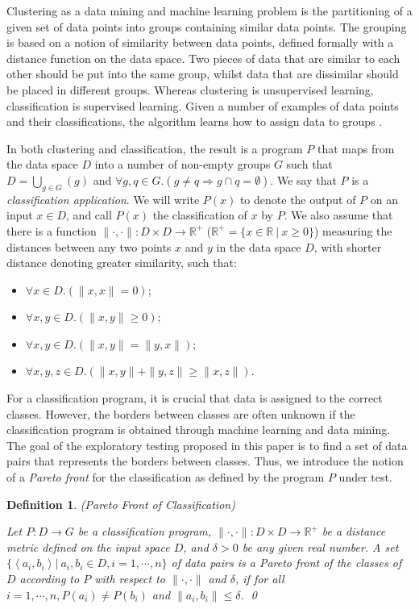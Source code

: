 \documentclass[preprint,1p,authoryear,times]{elsarticle}
\newtheorem{Definition}{Definition}
\begin{document}
Clustering as a data mining and machine learning problem is the partitioning of a given set of data points into groups containing similar data points. The grouping is based on a notion of similarity between data points, defined formally with a distance function on the data space. Two pieces of data that are similar to each other should be put into the same group, whilst data that are dissimilar should be placed in different groups. Whereas clustering is unsupervised learning, classification is supervised learning. Given a number of examples of data points and their classifications, the algorithm learns how to assign data to groups \citep{DataMiningTextBook, FoundationsOfMLBook, UnderstandingMLBook}. 

In both clustering and classification, the result is a program  $P$ that maps from the data space $D$ into a number of non-empty groups $G$ such that $D=\bigcup_{g \in G}(g)$ and $\forall g,q \in G.(g \neq q \Rightarrow g \cap q = \emptyset)$. We say that $P$ is a \emph{classification application}. We will write $P(x)$ to denote the output of $P$ on an input $x \in D$, and call $P(x)$ the classification of $x$ by $P$. We also assume that there is a function $\|\cdot,\cdot\|: D \times D \rightarrow \mathbb{R}^+$ ($\mathbb{R}^+ = \{ x \in \mathbb{R} ~|~ x \geq 0 \}$) measuring the distances between any two points $x$ and $y$ in the data space $D$, with shorter distance denoting greater similarity, such that:

\begin{itemize}
\item $\forall x \in D. (\|x,x\|=0)$; 
\item $\forall x,y \in D. (\|x,y\|\geq 0)$;
\item $\forall x, y \in D. (\|x,y\| = \|y,x\|)$; 
\item $\forall x,y,z \in D. (\|x,y\|+ \|y,z\| \geq \|x,z\|)$.
\end{itemize}

For a classification program, it is crucial that data is assigned to the correct classes. However, the borders between classes are often unknown if the classification program is obtained through machine learning and data mining. The goal of the exploratory testing proposed in this paper is to find a set of data pairs that represents the borders between classes. Thus, we introduce the notion of a \emph{Pareto front} for the classification as defined by the program $P$ under test. 

\begin{Definition} \label{def:Pareto} (Pareto Front of Classification) 

Let $P: D \rightarrow G$ be a classification program, $\|\cdot,\cdot\|: D \times  D \rightarrow  \mathbb{R}^+$ be a distance metric defined on the input space $D$, and  $\delta > 0$ be any given real number. A set $\{\left<a_i,b_i\right> |~ a_i, b_i \in D, i=1,\cdots,n \}$  of data pairs is a \emph{Pareto front} of the classes of $D$ according to $P$ with respect to $\|\cdot,\cdot\|$ and  $\delta$, if for all $i=1,\cdots, n, P(a_i ) \neq  P(b_i)$ and $\|a_i,b_i\| \leq \delta$. \qed
\end{Definition}
\end{document}
